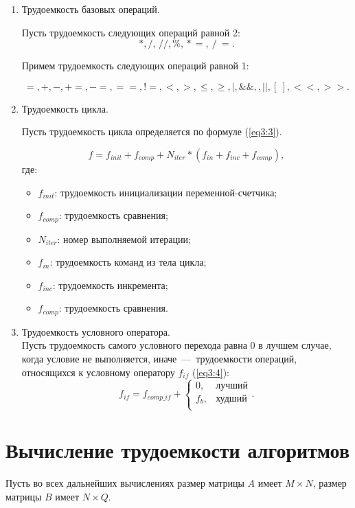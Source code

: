 \begin{enumerate}
	\item Трудоемкость базовых операций.
	
	Пусть трудоемкость следующих операций равной 2: 
	$$
	\label{eq3:1}
	*, /, \, //, \%, \mathrel{*}=, \mathrel{/}=.
	$$
	
	Примем трудоемкость следующих операций равной 1:
	
	$$
	\label{eq3:2}
	=, +, -, +=, -=, ==, \mathrel{!}=, <, >, \leq, \geq, |, \&\&,, ||, [\ ], <<, >>.
	$$
	
	\item Трудоемкость цикла.
	
	Пусть трудоемкость цикла определяется по формуле (\ref{eq3:3}).
	
	\begin{equation}
		\label{eq3:3} 
		f = f_{init} + f_{comp} + N_{iter} * (f_{in} + f_{inc} + f_{comp}),
	\end{equation} 
	где:
	\begin{itemize}
		\item $f_{init}$: трудоемкость инициализации переменной-счетчика;
		\item $f_{comp}$: трудоемкость сравнения;
		\item $N_{iter}$: номер выполняемой итерации;
		\item $f_{in}$: трудоемкость команд из тела цикла;
		\item $f_{inc}$: трудоемкость инкремента;
		\item $f_{comp}$: трудоемкость сравнения.
	\end{itemize}
	\item Трудоемкость условного оператора. \\
	Пусть трудоемкость самого условного перехода равна 0 в лучшем случае, когда условие не выполняется, иначе~---~трудоемкости операций, относящихся к условному оператору $f_{if}$ (\ref{eq3:4}): 
	\begin{equation}
		\label{eq3:4}
		f_{if} = f_{comp\_if} +
		\begin{cases}
			0, & \text{лучший}\\
			f_{b}, & \text{худший}\\
		\end{cases}.
	\end{equation}
	
\end{enumerate}


\section{Вычисление трудоемкости алгоритмов}
Пусть во всех дальнейших вычислениях размер матрицы $A$ имеет $M \times N$, размер матрицы $B$ имеет $N \times Q$.

